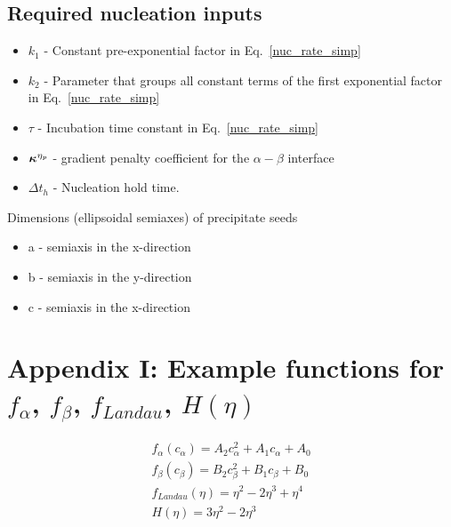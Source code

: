 \documentclass[11pt]{article}
\renewcommand{\=}[1]{\stackrel{#1}{=}} %
\theoremstyle{definition}
\theoremstyle{remark}
\def\Bkappa{\mbox{\boldmath$\kappa$}}
\begin{document}
\subsection{Required nucleation inputs}
\begin{itemize}
\item $k_1$ - Constant pre-exponential factor in Eq.~\eqref{nuc_rate_simp}
\item $k_2$ - Parameter that groups all constant terms of the first exponential factor in Eq.~\eqref{nuc_rate_simp} 
\item $\tau$ - Incubation time constant in Eq.~\eqref{nuc_rate_simp}
\item $\Bkappa^{\eta_p}$  - gradient penalty coefficient for the $\alpha - \beta$ interface
\item $\Delta t_h$ - Nucleation hold time.
\end{itemize}
Dimensions (ellipsoidal semiaxes) of precipitate seeds
\begin{itemize}
\item a - semiaxis in the x-direction
\item b - semiaxis in the y-direction
\item c - semiaxis in the x-direction
\end{itemize}

\section*{Appendix I: Example functions for $f_{\alpha}$, $f_{\beta}$, $f_{Landau}$, $H(\eta)$ }
\begin{gather}
f_{\alpha}(c_{\alpha}) = A_{2} c_{\alpha}^2 + A_{1} c_{\alpha} + A_{0} \\
f_{\beta}(c_{\beta}) = B_{2} c_{\beta}^2 + B_{1} c_{\beta} + B_{0} \\
f_{Landau}(\eta) = \eta^2  - 2\eta^3 +  \eta^4\\
H(\eta) = 3 \eta^2 - 2 \eta^3
\end{gather}
\end{document}
